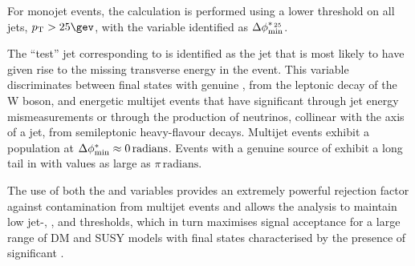For monojet events, the calculation is performed using a lower \Pt
threshold on all jets, $\Pt > 25\gev$, with the variable identified as
$\mbox{$\Delta\phi^{*_{\, 25}}_{\rm min}$}$.

The ``test'' jet corresponding to \bdphi is identified as the jet that
is most likely to have given rise to the missing transverse energy in
the event. This variable discriminates between final states with
genuine \ptvecmiss, \eg from the leptonic decay of the W boson, and
energetic multijet events that have significant \ptvecmiss through jet
energy mismeasurements or through the production of neutrinos,
collinear with the axis of a jet, from semileptonic heavy-flavour
decays. Multijet events exhibit a population at $\mbox{$\Delta\phi^{*}_{\rm min}$} \approx
0\,\mathrm{radians}$. Events with a genuine source of \ptvecmiss
exhibit a long tail in \bdphi with values as large as
$\pi\,\mathrm{radians}$.

The use of both the \bdphi and \alphat variables provides an extremely
powerful rejection factor against contamination from multijet events
and allows the analysis to maintain low jet-\PT, \HT, and \mht thresholds, which in
turn maximises signal acceptance for a large range of DM and SUSY
models with final states characterised by the presence of significant
\met.

